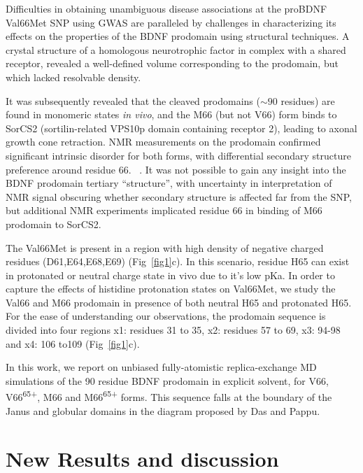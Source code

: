 \documentclass[journal=jacsat,manuscript=article]{achemso}
\begin{document}
Difficulties in obtaining unambiguous disease associations at the proBDNF Val66Met SNP using GWAS are paralleled by challenges in characterizing its effects on the properties of the BDNF prodomain using structural techniques.  A crystal structure of a homologous neurotrophic factor in complex with a shared receptor, revealed a well-defined volume corresponding to the prodomain, but which lacked resolvable density.\cite{Feng2010a} 

It was subsequently revealed that the cleaved prodomains ($\sim90$ residues) are found in monomeric states {\it in vivo}, and the M66 (but not V66) form binds to SorCS2 (sortilin-related VPS10p domain containing receptor 2), leading to axonal growth cone retraction.\cite{Anastasia2013} NMR measurements on the prodomain confirmed significant intrinsic disorder for both forms, with differential secondary structure preference around residue 66. ~\cite {Anastasia2013}.  It was not possible to gain any insight into the BDNF prodomain tertiary ``structure'', with uncertainty in interpretation of NMR signal obscuring whether secondary structure is affected far from the SNP, but additional NMR experiments implicated residue 66 in binding of M66 prodomain 
 to SorCS2.~\cite {Anastasia2013}
 
The Val66Met is present in a region with high density of negative charged residues (D61,E64,E68,E69) (Fig~\ref{fig1}c). In this scenario, residue H65 can exist in protonated or neutral charge state in vivo due to it's low pKa. In order to capture the effects of histidine protonation states on Val66Met, we study the Val66 and M66 prodomain in presence of both neutral H65 and protonated H65. For the ease of understanding our observations, the prodomain  sequence is divided into four regions x1: residues 31 to 35, x2: residues 57 to 69, x3:  94-98 and x4: 106 to109 (Fig~\ref{fig1}c).

In this work, we report on unbiased fully-atomistic replica-exchange MD simulations of the 90 residue BDNF prodomain in explicit solvent, for V66,   V66\textsuperscript{65+}, M66 and  M66\textsuperscript{65+} forms.  This sequence falls at the boundary of the Janus and globular domains in the diagram proposed by Das and Pappu. \cite{Das2015,Das2013a} 

\section{New Results and discussion}

\end{document}
